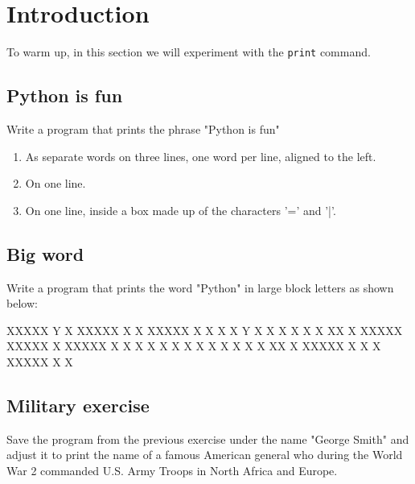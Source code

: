 
\section{Introduction}

To warm up, in this section we will experiment with the {\tt print} command.


\subsection{Python is fun}

Write a program that prints the phrase "Python is fun" 
\begin{enumerate}
\item As separate words on three lines, one word per line, aligned to the left.
\item On one line.
\item On one line, inside a box made up of the characters '=' and '|'.
\end{enumerate}


\subsection{Big word}

Write a program that prints the word "Python" in large block 
letters as shown below:

\begin{bluecode}
XXXXX Y   X XXXXX X   X XXXXX X   X
X   X Y   X   X   X   X X   X XX  X
XXXXX XXXXX   X   XXXXX X   X X X X
X         X   X   X   X X   X X  XX
X     XXXXX   X   X   X XXXXX X   X
\end{bluecode}


\subsection{Military exercise}

Save the program from the previous exercise under the name 
"George Smith" and adjust it to print the name of a famous American
general who during the World War 2 commanded U.S. Army Troops
in North Africa and Europe. 

